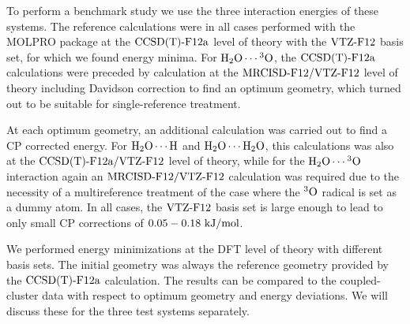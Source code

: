 To perform a benchmark study we use the three interaction energies of these
systems.
The reference calculations were in all cases performed with the MOLPRO \cite{MOLPRO_brief} package
at the $\text{CCSD(T)-F12a}$ \cite{KniziaAdlerWerner2009} level of theory with the
$\text{VTZ-F}12$\cite{YousafPeterson2008} basis set, for which we found energy minima.
For $\mbox{\ensuremath{\text H _2 \text O \cdots \hspace{.2pt} ^3\text{O}}}$, the $\text{CCSD(T)-F12a}$ calculations were preceded by  
calculation at the $\text{MRCISD-F12}/\text{VTZ-F}12$\cite{ShiozakiKniziaWerner2011} level of theory
including Davidson correction\cite{LanghoffDavidson1974} to find an optimum
geometry, which turned out to be suitable for single-reference treatment.

At each optimum geometry, an additional calculation was carried out to find a CP
corrected energy. For $\mbox{\ensuremath{\text H _2 \text O \cdots \text H}}$ and $\mbox{\ensuremath{\text H _2 \text O \cdots \text H _2 \text O}}$, this calculations was also at the $\text{CCSD(T)-F12a}/\text{VTZ-F}12$ level
of theory, while for the $\mbox{\ensuremath{\text H _2 \text O \cdots \hspace{.2pt} ^3\text{O}}}$ interaction again an $\text{MRCISD-F12}/\text{VTZ-F}12$ calculation was
required due to the necessity of a multireference treatment of the case where the
$^3\text O$ radical is set as a dummy atom. In all cases, the $\text{VTZ-F}12$ basis set is 
large enough to lead to only small CP corrections of $0.05 - 0.18 \ \text {kJ/mol}$. 

We performed energy minimizations at the DFT level of theory with different basis sets. The initial
geometry was always the reference geometry provided by the $\text{CCSD(T)-F12a}$ calculation. The results can be compared
to the coupled-cluster data with respect to optimum geometry and energy deviations. We will discuss
these for the three test systems separately.

